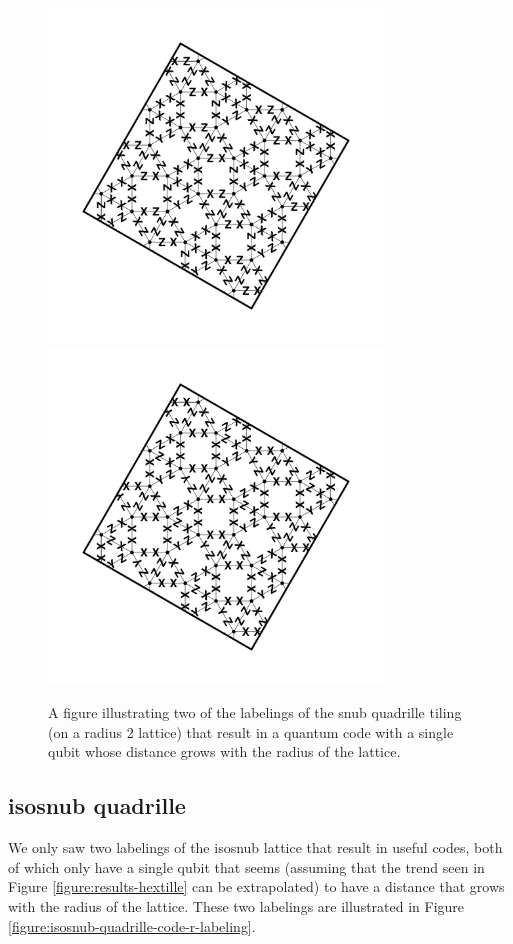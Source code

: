\documentclass{amsbook}
\theoremstyle{plain}
\theoremstyle{definition}
\theoremstyle{remark}
\begin{document}
\begin{figure}
\includegraphics[width=3.5in]{images/snub-quadrille-code-r-labeling-1} %
\includegraphics[width=3.5in]{images/snub-quadrille-code-r-labeling-2} %
\caption{
\label{figure:snub-quadrille-code-r-labeling}
A figure illustrating two of the labelings of the snub quadrille tiling (on a radius 2 lattice) that result in a quantum code with a single qubit whose distance grows with the radius of the lattice.
}
\end{figure}
\subsection{isosnub quadrille}

We only saw two labelings of the isosnub lattice that result in useful codes, both of which only have a single qubit that seems (assuming that the trend seen in Figure \ref{figure:results-hextille} can be extrapolated) to have a distance that grows with the radius of the lattice.  These two labelings are illustrated in Figure \ref{figure:isosnub-quadrille-code-r-labeling}.
\end{document}
